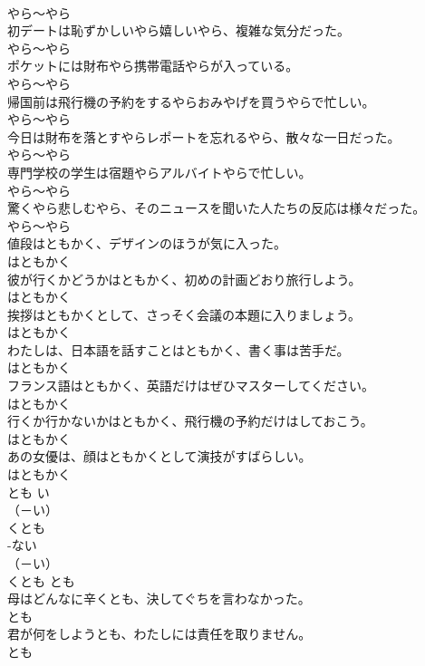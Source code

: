 \documentclass[8pt]{extreport}
\begin{document}
\begin{CJK}{UTF8}{min}
\\	やら～やら
\\	初デートは恥ずかしいやら嬉しいやら、複雑な気分だった。	
\\	やら～やら
\\	ポケットには財布やら携帯電話やらが入っている。	
\\	やら～やら
\\	帰国前は飛行機の予約をするやらおみやげを買うやらで忙しい。	
\\	やら～やら
\\	今日は財布を落とすやらレポートを忘れるやら、散々な一日だった。	
\\	やら～やら
\\	専門学校の学生は宿題やらアルバイトやらで忙しい。	
\\	やら～やら
\\	驚くやら悲しむやら、そのニュースを聞いた人たちの反応は様々だった。	
\\	やら～やら
\\	値段はともかく、デザインのほうが気に入った。	
\\	はともかく
\\	彼が行くかどうかはともかく、初めの計画どおり旅行しよう。	
\\	はともかく
\\	挨拶はともかくとして、さっそく会議の本題に入りましょう。	
\\	はともかく
\\	わたしは、日本語を話すことはともかく、書く事は苦手だ。	
\\	はともかく
\\	フランス語はともかく、英語だけはぜひマスターしてください。	
\\	はともかく
\\	行くか行かないかはともかく、飛行機の予約だけはしておこう。	
\\	はともかく
\\	あの女優は、顔はともかくとして演技がすばらしい。	
\\	はともかく
\\	とも	い
\\	（－い） 
\\	くとも	
\\	-ない
\\	（－い） 
\\	くとも	とも
\\	母はどんなに辛くとも、決してぐちを言わなかった。	
\\	とも
\\	君が何をしようとも、わたしには責任を取りません。	
\\	とも

\end{CJK}
\end{document}

